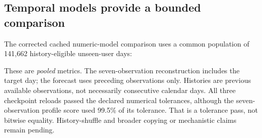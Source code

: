 \subsection{Temporal models provide a bounded comparison}
The corrected cached numeric-model comparison uses a common population of
141,662 history-eligible unseen-user days:
\begin{center}\end{center}
These are \emph{pooled} metrics. The seven-observation reconstruction includes
the target day; the forecast uses preceding observations only. Histories are
previous available observations, not necessarily consecutive calendar days.
All three checkpoint reloads passed the declared numerical tolerances, although
the seven-observation profile score used 99.5\% of its tolerance. That is a
tolerance pass, not bitwise equality. History-shuffle and broader copying or
mechanistic claims remain pending.
